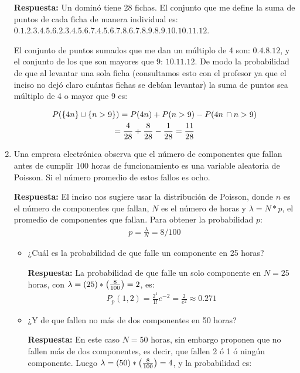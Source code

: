 \documentclass[12pt]{article}
\newcommand{\up}[1]{^{#1}}
\begin{document}
\begin{enumerate}
    \textbf{Respuesta:} Un dominó tiene 28 fichas. El conjunto que me define la suma de puntos de cada ficha de manera individual es: $\qty{0,1,2,3,4,5,6,2,3,4,5,6,7,4,5,6,7,8,6,7,8,9,8,9,10,10,11,12}$.
    
    El conjunto de puntos sumados que me dan un múltiplo de 4 son: $\qty{0,4,8,12}$, y el conjunto de los que son mayores que 9: $\qty{10,11,12}$. De modo la probabilidad de que al levantar una sola ficha (consultamos esto con el profesor ya que el inciso no dejó claro cuántas fichas se debían levantar) la suma de puntos sea múltiplo de 4 o mayor que 9 es:
    
    \begin{gather}
        P(\qty{4n}\cup\qty{n>9})= P(4n) + P(n>9) - P(4n \, \cap n>9)\\
        = \frac{4}{28}+\frac{8}{28}-\frac{1}{28} = \frac{11}{28}
    \end{gather}
    
    \item Una empresa electrónica observa que el número de componentes que fallan antes de cumplir 100 horas de funcionamiento es una variable aleatoria de Poisson. Si el número promedio de estos fallos es ocho.
    
        \textbf{Respuesta:} El inciso nos sugiere usar la distribución de Poisson, donde $n$ es el número de componentes que fallan, $N$ es el número de horas y $\lambda = N*p$, el promedio de componentes que fallan. Para obtener la probabilidad $p$:
        \begin{gather}
        p = \frac{\lambda}{N} = 8/100 
        \end{gather}
        
    \begin{itemize}
    
        \item ¿Cuál es la probabilidad de que falle un componente en 25 horas?
   
        \textbf{Respuesta:} La probabilidad de que falle un solo componente en $N=25$ horas, con $\lambda=(25)*\qty(\frac{8}{100})=2$, es:
        \begin{gather}
        P_p (1, 2) = \frac{2\up{1}}{1!}e\up{-2} = \frac{2}{e\up{2}} \approx 0.271
        \end{gather}
   
        \item ¿Y de que fallen no más de dos componentes en 50 horas?
         
         \textbf{Respuesta:} En este caso $N=50$ horas, sin embargo proponen que no fallen más de dos componentes, es decir, que fallen 2 ó 1 ó ningún componente. Luego $\lambda = (50)*\qty(\frac{8}{100})=4$, y la probabilidad es:
         

\end{itemize}
\end{enumerate}
\end{document}
